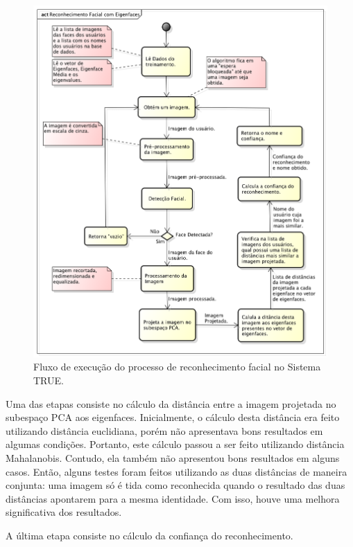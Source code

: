 			\begin{figure}[hbt]
			\begin{center}
				\includegraphics[scale=0.5]{figuras/4.ProblemaEProposta/diagrama-reconhecimento.png}
			\end{center}
			\caption{Fluxo de execução do processo de reconhecimento facial no Sistema TRUE.}
			\label{fig:diagrama-reconhecimento}
		\end{figure}

		Uma das etapas consiste no cálculo da distância entre a imagem projetada no
		subespaço PCA aos eigenfaces. Inicialmente, o cálculo desta distância era
		feito utilizando distância euclidiana, porém não apresentava bons resultados
		em algumas condições. Portanto, este cálculo passou a ser feito utilizando
		distância Mahalanobis. Contudo, ela também não apresentou bons resultados em
		alguns casos. Então, alguns testes foram feitos utilizando as duas distâncias
		de maneira conjunta: uma imagem só é tida como reconhecida quando o resultado
		das duas distâncias apontarem para a mesma identidade. Com isso, houve uma
		melhora significativa dos resultados.

		A última etapa consiste no cálculo da confiança do reconhecimento. 
		

